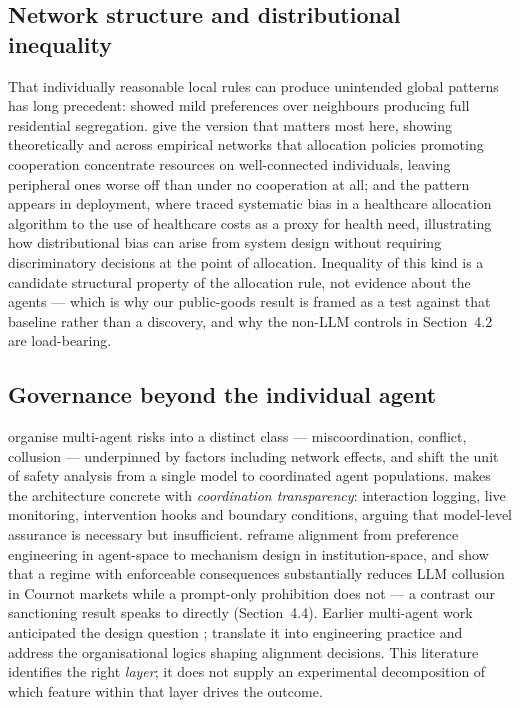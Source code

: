 \documentclass[11pt,a4paper]{article}
\begin{document}
\subsection{Network structure and distributional inequality}

That individually reasonable local rules can produce unintended
global patterns has long precedent: \citet{Schelling:1971:Segregation} showed mild
preferences over neighbours producing full residential segregation.
\citet{Sheng:2026:Equality} give the version that matters most here, showing
theoretically and across empirical networks that allocation policies
promoting cooperation concentrate resources on well-connected
individuals, leaving peripheral ones worse off than under no
cooperation at all; and the pattern appears in deployment, where
\citet{Obermeyer:2019:Bias} traced systematic bias in a healthcare
allocation algorithm to the use of healthcare costs as a proxy for
health need, illustrating how distributional bias can arise from
system design without requiring discriminatory decisions at the point
of allocation. Inequality of this kind is a candidate
structural property of the allocation rule, not evidence about the
agents --- which is why our public-goods result is framed as a test
against that baseline rather than a discovery, and why the non-LLM
controls in Section~4.2 are load-bearing.

\subsection{Governance beyond the individual agent}

\citet{Hammond:2025:MultiAgent} organise multi-agent risks into a distinct class
--- miscoordination, conflict, collusion --- underpinned by factors
including network effects, and \citet{Tomasev:2025:Distributional} shift the unit of
safety analysis from a single model to coordinated agent populations.
\citet{Bohr:2026:Coordination} makes the architecture concrete with
\emph{coordination transparency}: interaction logging, live
monitoring, intervention hooks and boundary conditions, arguing that
model-level assurance is necessary but insufficient.
\citet{Pierucci:2026:Institutional} reframe alignment from preference engineering in
agent-space to mechanism design in institution-space, and
\citet{BracaleSyrnikov:2026:Collusion} show that a regime with enforceable
consequences substantially reduces LLM collusion in Cournot markets
while a prompt-only prohibition does not --- a contrast our
sanctioning result speaks to directly (Section~4.4). Earlier
multi-agent work anticipated the design question
\citep{Shoham:1995:Laws,Boella:2006:Normative,Savarimuthu:2011:Norms}; \citet{Shavit:2023:Agentic}
translate it into engineering practice and \citet{Sarkar:2026:Transparency} address
the organisational logics shaping alignment decisions. This literature
identifies the right \emph{layer}; it does not supply an experimental
decomposition of which feature within that layer drives the
outcome.
\end{document}
